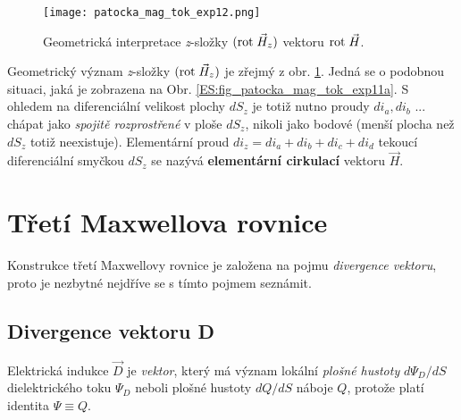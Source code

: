       \begin{figure}[ht!]
        \centering
        \texttt{[image: patocka\_mag\_tok\_exp12.png]}
        \caption{Geometrická interpretace \emph{z}-složky \((\mathrm{rot}\;\vec{H}_z)\) vektoru \(\mathrm{rot}\;\vec{H}\).}
        \label{es:fig_patocka_mag_tok_exp12}
      \end{figure}
      Geometrický význam \emph{z}-složky \((\mathrm{rot}\;\vec{H}_z)\) je zřejmý z obr. 
      \ref{es:fig_patocka_mag_tok_exp12}. Jedná se o podobnou situaci, jaká je zobrazena na Obr. 
      \ref{ES:fig_patocka_mag_tok_exp11a}. S ohledem na diferenciální velikost plochy \(dS_z\) je 
      totiž nutno proudy \(di_a, di_b\) ... chápat jako \emph{spojitě rozprostřené} v ploše 
      \(dS_z\), nikoli jako bodové (menší plocha než \(dS_z\) totiž neexistuje). Elementární proud 
      \(di_z = di_a + di_b + di_c + di_d\) tekoucí diferenciální smyčkou \(dS_z\) se nazývá 
      \textbf{ elementární cirkulací} vektoru \(\vec{H}\).

  \section{Třetí Maxwellova rovnice}\label{ES:sec08}
    Konstrukce třetí Maxwellovy rovnice je založena na pojmu \emph{divergence vektoru}, proto je 
    nezbytné nejdříve se s tímto pojmem seznámit.
    
    \subsection{Divergence vektoru D}\label{ES:ssec01}
      Elektrická indukce \(\vec{D}\) je \emph{vektor}, který má význam lokální \emph{plošné 
      hustoty} \(d\Psi_D/dS\) dielektrického toku \(\Psi_D\) neboli plošné hustoty \(dQ/dS\) náboje 
      \(Q\), protože platí identita \(\Psi\equiv Q\).
      
